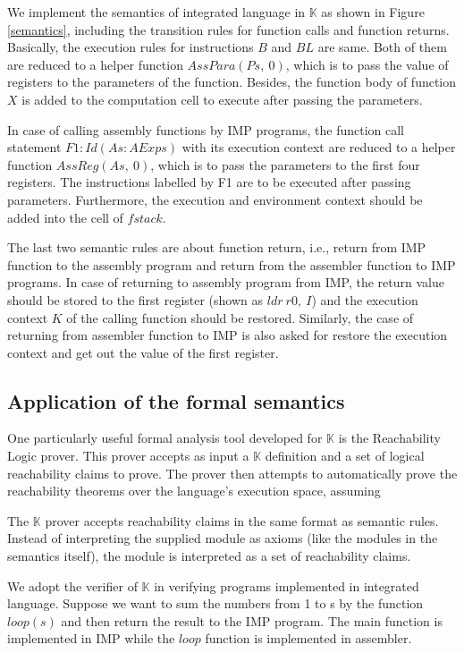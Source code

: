 \documentclass[letterpaper, 10 pt, conference]{IEEEtran}
\begin{document}
\par We implement the semantics of integrated language in $\mathbb{K}$ as shown in Figure \ref{semantics}, including the transition rules for function calls and function returns. Basically, the execution rules for instructions $B$ and $BL$ are same. Both of them are reduced to a helper function $AssPara(Ps,~0)$, which is to pass the value of registers to the parameters of the function. Besides, the function body of function $X$ is added to the computation cell to execute after passing the parameters.
\par In case of calling assembly functions by IMP programs, the function call statement $F1:Id(As:AExps)$ with its execution context are reduced to a helper function $AssReg(As,~0)$, which is to pass the parameters to the first four registers. The instructions labelled by F1 are to be executed after  passing parameters. Furthermore, the execution and environment context should be added into the cell of $fstack$.
\par The last two semantic rules are about function return, i.e., return from IMP function to the assembly program and return from the assembler function to IMP programs. In case of returning to assembly program from IMP, the return value should be stored to the first register (shown as $ldr~r0,~I$) and the execution context $K$ of the calling function should be restored. Similarly, the case of returning from assembler function to IMP is also asked for restore the execution context and get out the value of the first register.
\subsection{Application of the formal semantics}
\par One particularly useful formal analysis tool developed for $\mathbb{K}$ is the Reachability Logic prover. This prover
accepts as input a $\mathbb{K}$ definition and a set of logical reachability claims to prove. The prover then attempts
to automatically prove the reachability theorems over the language's execution space, assuming
\par The $\mathbb{K}$ prover accepts reachability claims in the same format as semantic rules.
Instead of interpreting the supplied module as axioms (like the modules in the semantics itself), the module is interpreted as a set of reachability claims.
\par We adopt the verifier of $\mathbb{K}$ in verifying programs implemented in integrated language. Suppose we want to sum the numbers from 1 to s by the function $loop(s)$ and then return the result to the IMP program. The main function is implemented in IMP while the $loop$ function is implemented in assembler.
\end{document}
